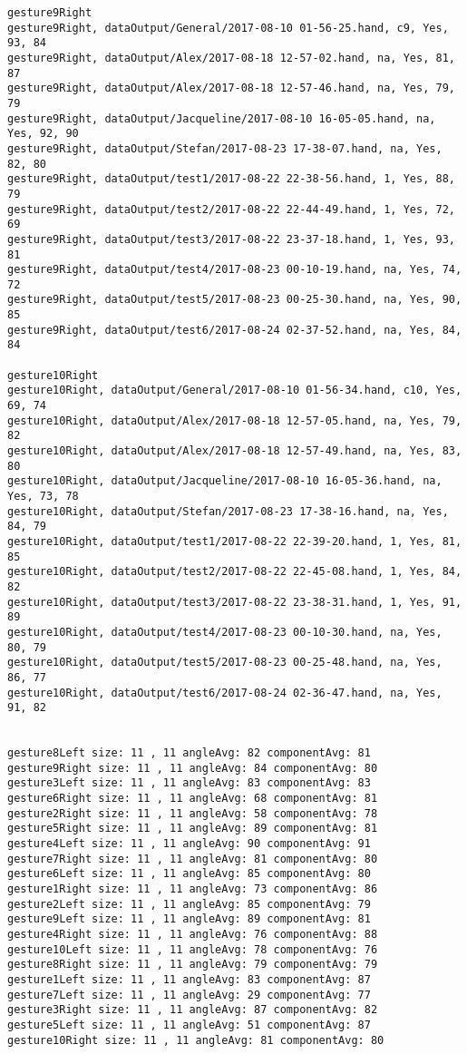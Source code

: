 \begin{verbatim}
gesture9Right
gesture9Right, dataOutput/General/2017-08-10 01-56-25.hand, c9, Yes, 93, 84
gesture9Right, dataOutput/Alex/2017-08-18 12-57-02.hand, na, Yes, 81, 87
gesture9Right, dataOutput/Alex/2017-08-18 12-57-46.hand, na, Yes, 79, 79
gesture9Right, dataOutput/Jacqueline/2017-08-10 16-05-05.hand, na, Yes, 92, 90
gesture9Right, dataOutput/Stefan/2017-08-23 17-38-07.hand, na, Yes, 82, 80
gesture9Right, dataOutput/test1/2017-08-22 22-38-56.hand, 1, Yes, 88, 79
gesture9Right, dataOutput/test2/2017-08-22 22-44-49.hand, 1, Yes, 72, 69
gesture9Right, dataOutput/test3/2017-08-22 23-37-18.hand, 1, Yes, 93, 81
gesture9Right, dataOutput/test4/2017-08-23 00-10-19.hand, na, Yes, 74, 72
gesture9Right, dataOutput/test5/2017-08-23 00-25-30.hand, na, Yes, 90, 85
gesture9Right, dataOutput/test6/2017-08-24 02-37-52.hand, na, Yes, 84, 84

gesture10Right
gesture10Right, dataOutput/General/2017-08-10 01-56-34.hand, c10, Yes, 69, 74
gesture10Right, dataOutput/Alex/2017-08-18 12-57-05.hand, na, Yes, 79, 82
gesture10Right, dataOutput/Alex/2017-08-18 12-57-49.hand, na, Yes, 83, 80
gesture10Right, dataOutput/Jacqueline/2017-08-10 16-05-36.hand, na, Yes, 73, 78
gesture10Right, dataOutput/Stefan/2017-08-23 17-38-16.hand, na, Yes, 84, 79
gesture10Right, dataOutput/test1/2017-08-22 22-39-20.hand, 1, Yes, 81, 85
gesture10Right, dataOutput/test2/2017-08-22 22-45-08.hand, 1, Yes, 84, 82
gesture10Right, dataOutput/test3/2017-08-22 23-38-31.hand, 1, Yes, 91, 89
gesture10Right, dataOutput/test4/2017-08-23 00-10-30.hand, na, Yes, 80, 79
gesture10Right, dataOutput/test5/2017-08-23 00-25-48.hand, na, Yes, 86, 77
gesture10Right, dataOutput/test6/2017-08-24 02-36-47.hand, na, Yes, 91, 82


gesture8Left size: 11 , 11 angleAvg: 82 componentAvg: 81
gesture9Right size: 11 , 11 angleAvg: 84 componentAvg: 80
gesture3Left size: 11 , 11 angleAvg: 83 componentAvg: 83
gesture6Right size: 11 , 11 angleAvg: 68 componentAvg: 81
gesture2Right size: 11 , 11 angleAvg: 58 componentAvg: 78
gesture5Right size: 11 , 11 angleAvg: 89 componentAvg: 81
gesture4Left size: 11 , 11 angleAvg: 90 componentAvg: 91
gesture7Right size: 11 , 11 angleAvg: 81 componentAvg: 80
gesture6Left size: 11 , 11 angleAvg: 85 componentAvg: 80
gesture1Right size: 11 , 11 angleAvg: 73 componentAvg: 86
gesture2Left size: 11 , 11 angleAvg: 85 componentAvg: 79
gesture9Left size: 11 , 11 angleAvg: 89 componentAvg: 81
gesture4Right size: 11 , 11 angleAvg: 76 componentAvg: 88
gesture10Left size: 11 , 11 angleAvg: 78 componentAvg: 76
gesture8Right size: 11 , 11 angleAvg: 79 componentAvg: 79
gesture1Left size: 11 , 11 angleAvg: 83 componentAvg: 87
gesture7Left size: 11 , 11 angleAvg: 29 componentAvg: 77
gesture3Right size: 11 , 11 angleAvg: 87 componentAvg: 82
gesture5Left size: 11 , 11 angleAvg: 51 componentAvg: 87
gesture10Right size: 11 , 11 angleAvg: 81 componentAvg: 80


\end{verbatim}

